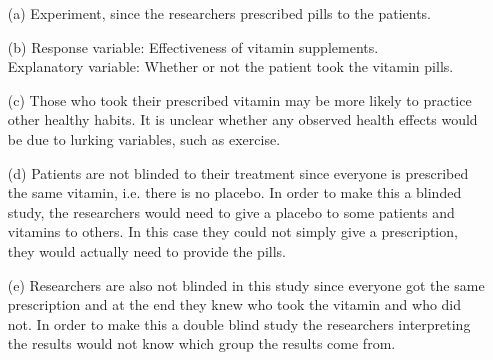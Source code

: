 {
\begin{enumerate}
\item[(a)] Experiment, since the researchers prescribed pills to the patients.
\item[(b)] Response variable: Effectiveness of vitamin supplements. \\
Explanatory variable: Whether or not the patient took the vitamin pills.
\item[(c)] Those who took their prescribed vitamin may be more likely to practice other healthy habits. It is unclear whether any observed health effects would be due to lurking variables, such as exercise.
\item[(d)] Patients are not blinded to their treatment since everyone is prescribed the same vitamin, i.e. there is no placebo. In order to make this a blinded study, the researchers would need to give a placebo to some patients and vitamins to others. In this case they could not simply give a prescription, they would actually need to provide the pills.
\item[(e)] Researchers are also not blinded in this study since everyone got the same prescription and at the end they knew who took the vitamin and who did not. In order to make this a double blind study the researchers interpreting the results would not know which group the results come from.
\end{enumerate}
}

